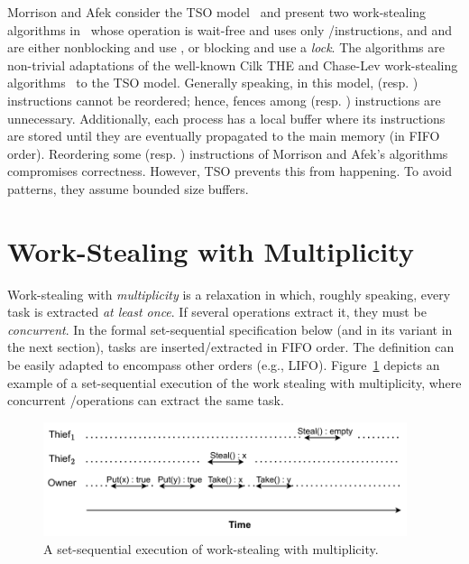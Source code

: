 Morrison and Afek consider the TSO model~\cite{DBLP_journals_cacm_SewellSONM10} and present two work-stealing algorithms in~\cite{fencefreework} whose \Put operation is wait-free and uses only \R/\W instructions,  and \Take and \Steal are either nonblocking and use \CAS, or blocking and use a \emph{lock}.  The algorithms are non-trivial adaptations of the well-known Cilk THE and Chase-Lev work-stealing algorithms~\cite{circular.work.stealing, FLR98} to the TSO model.  Generally speaking, in this model, \W (resp. \R) instructions cannot be reordered; hence, fences among \W (resp. \R) instructions are unnecessary. Additionally, each process has a local buffer where its \W instructions are stored until they are eventually propagated to the main memory (in FIFO order).  Reordering some \W (resp. \R) instructions of Morrison and Afek's algorithms compromises correctness. However, TSO prevents this from happening.  To avoid \RAW patterns, they assume bounded size \W buffers.

\section{\label{sec-ws-mult}Work-Stealing with Multiplicity}

Work-stealing with \emph{multiplicity} is a relaxation in which, roughly speaking, every task is extracted \emph{at least once}. If several operations extract it, they must be \emph{concurrent}.
In the formal set-sequential specification below (and in its variant in the next section), tasks are inserted/extracted in FIFO order. The definition can be easily adapted to encompass other orders (e.g., LIFO). Figure~\ref{fig-example-execution} depicts an example of a set-sequential execution of the work stealing with multiplicity, where concurrent \Take/\Steal operations can extract the same task.

\begin{figure}[ht]
  \begin{center}
    \includegraphics[width=0.95\textwidth]{contents/figures/IV_1_set-linearizability.pdf}
    \caption{\label{fig-example-execution}A set-sequential execution
      of work-stealing with multiplicity.}
  \end{center}
\end{figure}


